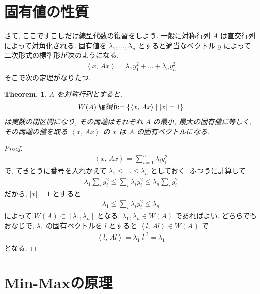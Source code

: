 \documentclass[openany, a4paper, oneside]{jsbook}
\makeatletter
\newcommand*{\defeq}{\mathrel{\rlap{%
\raisebox{0.3ex}{$\m@th\cdot$}}%
\raisebox{-0.3ex}{$\m@th\cdot$}}%
=}
\theoremstyle{break}
\newtheorem{thm}{Theorem.}[section]
\theoremstyle{breakdefn}
\newcommand{\abs}[1]{\left|#1\right|}
\newcommand{\bkt}[2]{\left\langle#1,\,#2\right\rangle}
\newcommand{\relmiddle}[1]{\mathrel{}\middle#1\mathrel{}}
\newcommand{\set}[2]{\left\{#1 \relmiddle| #2\right\}}
\makeatother
\begin{document}
\section{固有値の性質}


さて, ここですこしだけ線型代数の復習をしよう.
一般に対称行列 $A$ は直交行列によって対角化される.
固有値を $\lambda_1, \dots, \lambda_n$ とすると適当なベクトル $y$ によって二次形式の標準形が次のようになる.
\begin{align}
 \bkt{x}{Ax}
 =
 \lambda_1 y_1^2 + \dots + \lambda_n y_n^2
\end{align}
そこで次の定理がなりたつ.
\begin{thm}
 $A$ を対称行列とすると,
 \begin{align}
  W(A)
  \defeq
  \set{\bkt{x}{Ax}}{|x| = 1}
 \end{align}
 は実数の閉区間になり, その両端はそれぞれ $A$ の最小, 最大の固有値に等しく,
 その両端の値を取る $\bkt{x}{Ax}$ の $x$ は $A$ の固有ベクトルになる.
\end{thm}
\begin{proof}
\begin{align}
 \bkt{x}{Ax}
 =
 \sum_{i=1}^n \lambda_i y_i^2
\end{align}
で, てきとうに番号を入れかえて $\lambda_1 \le \dots \le \lambda_n$ としておく.
ふつうに計算して
\begin{align}
 \lambda_1 \sum_i y_i^2
 \le
 \sum_i \lambda_i y_i^2
 \le
 \lambda_n \sum_i y_i^2
\end{align}
だから, $\abs{x}=1$ とすると
\begin{align}
 \lambda_1
 \le
 \sum_i \lambda_i y_i^2
 \le
 \lambda_n
\end{align}
によって $W(A) \subset [\lambda_1, \lambda_n]$
となる.
$\lambda_1, \lambda_n \in W(A)$ であればよい.
どちらでもおなじで, $\lambda_1$ の固有ベクトルを $l$ とすると $\bkt{l}{Al} \in W(A)$ で
\begin{align}
 \bkt{l}{Al}
 =
 \lambda_1 \abs{l}^2
 =
 \lambda_1
\end{align}
となる.
\end{proof}
\section{Min-Maxの原理}
\end{document}
